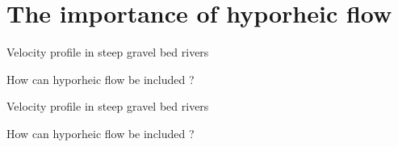 \section{The importance of hyporheic flow}
\begin{frame}{Velocity profile in steep gravel bed rivers}

    \begin{figure}
        \centering
        
    \end{figure}
    {\begin{center}
        \color{normal bg} How can hyporheic flow be included ?
    \end{center}}

\end{frame}

\begin{frame}{Velocity profile in steep gravel bed rivers}

    \begin{figure}
        \centering
        
    \end{figure}
    {\begin{center}
        \color{toravalr} How can hyporheic flow be included ?
    \end{center}}

\end{frame}

